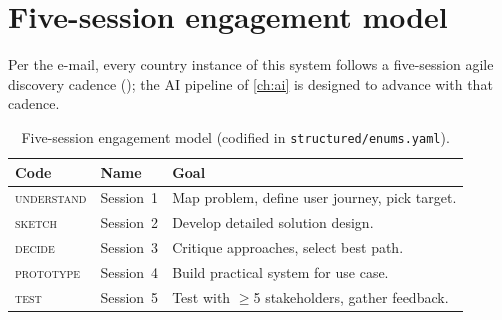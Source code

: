 \section{Five-session engagement model}

Per the e-mail, every country instance of this system follows a
five-session agile discovery cadence
(); the AI pipeline of \cref{ch:ai} is designed to
advance with that cadence.

\begin{table}[htbp]
\centering
\caption{Five-session engagement model (codified in
         \corpus\texttt{structured/enums.yaml}).}
\label{tab:sessions}
\small
\begin{tabularx}{\linewidth}{@{}l l X@{}}
\toprule
\textbf{Code} & \textbf{Name} & \textbf{Goal} \\ \midrule
\textsc{understand} & Session~1 & Map problem, define user journey, pick target. \\
\textsc{sketch}     & Session~2 & Develop detailed solution design. \\
\textsc{decide}     & Session~3 & Critique approaches, select best path. \\
\textsc{prototype}  & Session~4 & Build practical system for use case. \\
\textsc{test}       & Session~5 & Test with $\geq$5 stakeholders, gather feedback. \\
\bottomrule
\end{tabularx}
\end{table}
